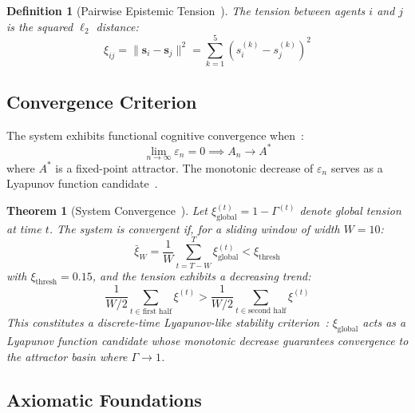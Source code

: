 \documentclass[conference]{IEEEtran}
\newtheorem{definition}{Definition}
\newtheorem{theorem}{Theorem}
\begin{document}
\begin{definition}[Pairwise Epistemic Tension~\cite{harrison2026codettefull}]
\label{def:tension}
The tension between agents $i$ and $j$ is the squared $\ell_2$ distance:
\begin{equation}
  \xi_{ij} = \|\mathbf{s}_i - \mathbf{s}_j\|^2 = \sum_{k=1}^{5} (s_i^{(k)} - s_j^{(k)})^2
  \label{eq:pairwise_tension}
\end{equation}
\end{definition}

\subsection{Convergence Criterion}

The system exhibits functional cognitive convergence when~\cite{harrison2026codettefull}:
\begin{equation}
  \lim_{n \to \infty} \varepsilon_n = 0 \implies A_n \to A^*
  \label{eq:convergence}
\end{equation}
where $A^*$ is a fixed-point attractor. The monotonic decrease of $\varepsilon_n$ serves as a Lyapunov function candidate~\cite{khalil2002nonlinear}.

\begin{theorem}[System Convergence~\cite{harrison2026codettefull}]
\label{thm:convergence}
Let $\xi^{(t)}_{\text{global}} = 1 - \Gamma^{(t)}$ denote global tension at time $t$. The system is convergent if, for a sliding window of width $W = 10$:
\begin{equation}
  \bar{\xi}_W = \frac{1}{W}\sum_{t=T-W}^{T} \xi^{(t)}_{\text{global}} < \xi_{\text{thresh}}
  \label{eq:convergence_criterion}
\end{equation}
with $\xi_{\text{thresh}} = 0.15$, and the tension exhibits a decreasing trend:
\begin{equation}
  \frac{1}{W/2}\sum_{t \in \text{first half}} \xi^{(t)} > \frac{1}{W/2}\sum_{t \in \text{second half}} \xi^{(t)}
  \label{eq:decreasing_trend}
\end{equation}
This constitutes a discrete-time Lyapunov-like stability criterion~\cite{khalil2002nonlinear}: $\xi_{\text{global}}$ acts as a Lyapunov function candidate whose monotonic decrease guarantees convergence to the attractor basin where $\Gamma \to 1$.
\end{theorem}

\subsection{Axiomatic Foundations}
\end{document}
